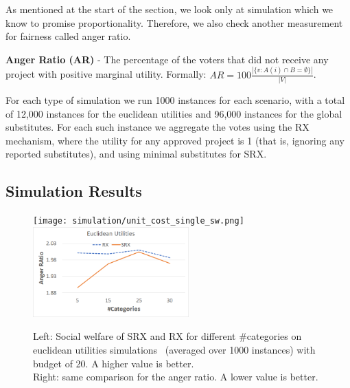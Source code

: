 \documentclass[runningheads]{llncs}
\begin{document}
As mentioned at the start of the section, we look only at simulation which we know to promise proportionality. Therefore, we also check another measurement for fairness called anger ratio.

\textbf{Anger Ratio (AR)} - The percentage of the voters that did not receive any project with positive marginal utility. Formally: $AR=100\frac{|\{v:A(i)\cap B=\emptyset\}|}{|V|}$.

For each  type of simulation we run 1000 instances for each scenario, with a total of 12,000 instances for the euclidean utilities and 96,000 instances for the global substitutes. For each such instance we aggregate the votes using the RX mechanism, where the utility for any approved project is 1 (that is, ignoring any reported substitutes),  and using minimal substitutes for SRX.

\subsection{Simulation Results}




\begin{figure}[t]
\begin{center}
\texttt{[image: simulation/unit\_cost\_single\_sw.png]}
\includegraphics[width=6cm]{simulation/unit_cost_single_ar.png}
\caption{Left: Social welfare  of SRX and RX for different \#categories on euclidean utilities simulations~ (averaged over 1000 instances) with budget of 20. A higher value is better.\\
 Right: same comparison for the anger ratio. A lower value is better.
}\label{fig:type1}\vspace{-7.5mm}
\end{center}
\end{figure}
\end{document}
